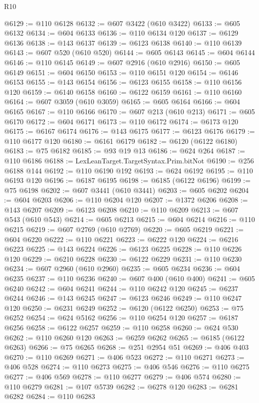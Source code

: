 \begin{lexlean}{R10}
\begin{coremodule}
@6129 := @110 @6128
@6132 := @607 @3422 (@610 @3422)
@6133 := @605 @6132
@6134 := @604 @6133
@6136 := @110 @6134 @120
@6137 := @6129 @6136
@6138 := @143 @6137
@6139 := @6123 @6138
@6140 := @110 @6139
@6143 := @607 @520 (@610 @520)
@6144 := @605 @6143
@6145 := @604 @6144
@6146 := @110 @6145
@6149 := @607 @2916 (@610 @2916)
@6150 := @605 @6149
@6151 := @604 @6150
@6153 := @110 @6151 @120
@6154 := @6146 @6153
@6155 := @143 @6154
@6156 := @6123 @6155
@6158 := @110 @6156 @120
@6159 := @6140 @6158
@6160 := @6122 @6159
@6161 := @110 @6160
@6164 := @607 @3059 (@610 @3059)
@6165 := @605 @6164
@6166 := @604 @6165
@6167 := @110 @6166
@6170 := @607 @213 (@610 @213)
@6171 := @605 @6170
@6172 := @604 @6171
@6173 := @110 @6172
@6174 := @6173 @120
@6175 := @6167 @6174
@6176 := @143 @6175
@6177 := @6123 @6176
@6179 := @110 @6177 @120
@6180 := @6161 @6179
@6182 := @6120 (@6122 @6180)
@6183 := @75 @6182
@6185 := @93 @19 @13
@6186 := @624 @264
@6187 := @110 @6186
@6188 := LexLeanTarget.TargetSyntax.Prim.bitNot
@6190 := @256 @6188 @144
@6192 := @110 @6190 @192
@6193 := @624 @6192
@6195 := @110 @6193 @120
@6196 := @6187 @6195
@6198 := @6185 (@6122 @6196)
@6199 := @75 @6198
@6202 := @607 @3441 (@610 @3441)
@6203 := @605 @6202
@6204 := @604 @6203
@6206 := @110 @6204 @120
@6207 := @1372 @6206
@6208 := @143 @6207
@6209 := @6123 @6208
@6210 := @110 @6209
@6213 := @607 @543 (@610 @543)
@6214 := @605 @6213
@6215 := @604 @6214
@6216 := @110 @6215
@6219 := @607 @2769 (@610 @2769)
@6220 := @605 @6219
@6221 := @604 @6220
@6222 := @110 @6221
@6223 := @6222 @120
@6224 := @6216 @6223
@6225 := @143 @6224
@6226 := @6123 @6225
@6228 := @110 @6226 @120
@6229 := @6210 @6228
@6230 := @6122 @6229
@6231 := @110 @6230
@6234 := @607 @2960 (@610 @2960)
@6235 := @605 @6234
@6236 := @604 @6235
@6237 := @110 @6236
@6240 := @607 @400 (@610 @400)
@6241 := @605 @6240
@6242 := @604 @6241
@6244 := @110 @6242 @120
@6245 := @6237 @6244
@6246 := @143 @6245
@6247 := @6123 @6246
@6249 := @110 @6247 @120
@6250 := @6231 @6249
@6252 := @6120 (@6122 @6250)
@6253 := @75 @6252
@6254 := @624 @5162
@6256 := @110 @6254 @120
@6257 := @6187 @6256
@6258 := @6122 @6257
@6259 := @110 @6258
@6260 := @624 @530
@6262 := @110 @6260 @120
@6263 := @6259 @6262
@6265 := @6185 (@6122 @6263)
@6266 := @75 @6265
@6268 := @251 @2954 @51
@6269 := @406 @403
@6270 := @110 @6269
@6271 := @406 @523
@6272 := @110 @6271
@6273 := @406 @528
@6274 := @110 @6273
@6275 := @406 @546
@6276 := @110 @6275
@6277 := @406 @569
@6278 := @110 @6277
@6279 := @406 @574
@6280 := @110 @6279
@6281 := @107 @5739
@6282 := @6278 @120
@6283 := @6281 @6282
@6284 := @110 @6283

\end{coremodule}
\end{lexlean}
